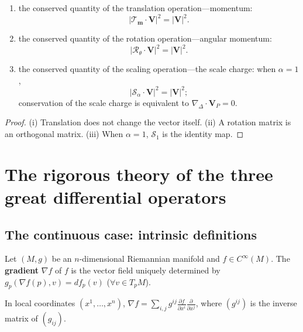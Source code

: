 \begin{theorem}\label{thm:lattice_three_conservation}
\leavevmode
\begin{enumerate}[label=(\roman*)]
    \item the conserved quantity of the translation operation---momentum:
    \[
    |\mathcal{T}_{\mathbf{m}}\cdot\mathbf{V}|^2=|\mathbf{V}|^2.
    \]
    \item the conserved quantity of the rotation operation---angular momentum:
    \[
    |\mathcal{R}_\theta\cdot\mathbf{V}|^2=|\mathbf{V}|^2.
    \]
    \item the conserved quantity of the scaling operation---the scale charge: when $\alpha=1$,
    \[
    |\mathcal{S}_\alpha\cdot\mathbf{V}|^2=|\mathbf{V}|^2;
    \]
    conservation of the scale charge is equivalent to $\nabla_{\Delta}\cdot\mathbf{V}_P=0$.
\end{enumerate}
\end{theorem}

\begin{proof}
(i) Translation does not change the vector itself. (ii) A rotation matrix is an orthogonal matrix. (iii) When $\alpha=1$, $\mathcal{S}_1$ is the identity map.
\end{proof}

\section{The rigorous theory of the three great differential operators}\label{sec:three_operators_strict}

\subsection{The continuous case: intrinsic definitions}

\begin{definition}\label{def:gradient_intrinsic}
Let $(M,g)$ be an $n$-dimensional Riemannian manifold and $f\in C^\infty(M)$. The \textbf{gradient} $\nabla f$ of $f$ is the vector field uniquely determined by $g_p(\nabla f(p),v)=df_p(v)$ ($\forall v\in T_pM$).
\end{definition}

\begin{proposition}\label{prop:gradient_coordinate}
In local coordinates $(x^1,\dots,x^n)$, $\nabla f=\sum_{i,j}g^{ij}\frac{\partial f}{\partial x^i}\frac{\partial}{\partial x^j}$, where $(g^{ij})$ is the inverse matrix of $(g_{ij})$.
\end{proposition}

